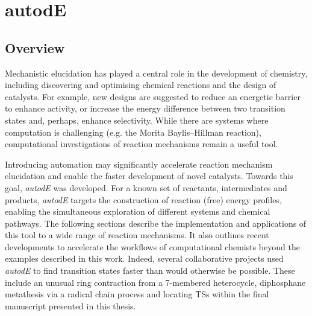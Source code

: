 \documentclass[../../main.tex]{subfiles}
\begin{document}
\setcounter{footnote}{0} 


\chapter{autodE}

\section{Overview}


Mechanistic elucidation has played a central role in the development of chemistry, including discovering and optimising chemical reactions and the design of catalysts. For example, new designs are suggested to reduce an energetic barrier to enhance activity, or increase the energy difference between two transition states and, perhaps, enhance selectivity. While there are systems where computation is challenging (e.g. the Morita Baylis–Hillman reaction\cite{Plata2015}), computational investigations of reaction mechanisms remain a useful tool.

Introducing automation may significantly accelerate reaction mechanism elucidation and enable the faster development of novel catalysts. Towards this goal, \emph{autodE} was developed. For a known set of reactants, intermediates and products,  \emph{autodE} targets the construction of reaction (free) energy profiles, enabling the simultaneous exploration of different systems and chemical pathways. The following sections describe the implementation and applications of this tool to a wide range of reaction mechanisms. It also outlines recent developments to accelerate the workflows of computational chemists beyond the examples described in this work. Indeed, several collaborative projects used \emph{autodE} to find transition states faster than would otherwise be possible. These include an unusual ring contraction from a 7-membered heterocycle,\cite{Wang2020} diphosphane metathesis via a radical chain process\cite{Branfoot2021} and locating TSs within the final manuscript presented in this thesis.\cite{Young2021GAP}


\clearpage
\end{document}
